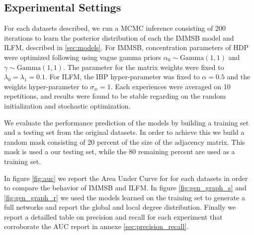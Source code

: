 \subsection{Experimental Settings}
For each datasets described,  we run a MCMC inference consisting of 200 iterations to learn the posterior distribution of each the IMMSB model and ILFM, described in \ref{sec:models}. For IMMSB, concentration parameters of HDP were optimized following \cite{HDP} using vague gamma priors $\alpha_0 \sim \text{Gamma}(1,1)$ and       $\gamma \sim \text{Gamma}(1,1)$. The parameter for the matrix weights were fixed to $\lambda_0=\lambda_1=0.1$. For ILFM, the IBP hyper-parameter was fixed to   $\alpha=0.5$ and the weights hyper-parameter to $\sigma_w = 1$. Each experiences were averaged on 10 repetitions, and results were found to be stable regarding on the random  initialization and stochastic optimization.


We evaluate the performance prediction of the models by building a training set and a testing set from the original datasets. In order to achieve this we build a random mask consisting of 20 percent of the size of the adjacency matrix. This mask is used a our testing set, while the 80 remaining percent are used as a training set.

In figure \ref{fig:auc} we report the Area Under Curve for for each datasets in order to compare the behavior of IMMSB and ILFM. In figure \ref{fig:gen_graph_s} and \ref{fig:gen_graph_r} we used the models learned on the training set to generate a full networks and report the global and local degree distribution. Finally we report a detailled table on precision and recall for each experiment that corroborate the AUC report in annexe \ref{sec:precision_recall}.

